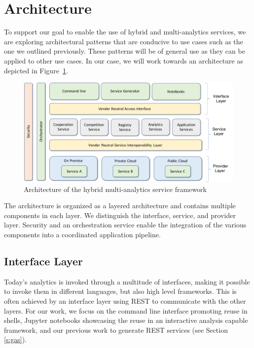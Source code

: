 
\section{Architecture}



To support our goal to enable the use of hybrid and multi-analytics
services, we are exploring architectural patterns
that are conducive to use cases such as the one we outlined
previously. These patterns will be of general use as they can
be applied to other use cases. In our case, we will work towards an
architecture as depicted in Figure~\ref{fig:arch}.

\begin{figure}[htb]
  \begin{center}
    \includegraphics[width=1.0\columnwidth]{images/hybrid-service-arch.pdf}
    \end{center}
  \caption {Architecture of the hybrid multi-analytics service
    framework}
  \label{fig:arch}
\end{figure}

The architecture is organized as a layered architecture and contains
multiple components in each layer. We distinguish the interface,
service, and provider layer. Security and an orchestration service
enable the integration of the various components into a coordinated
application pipeline.

\subsection{Interface Layer}

Today's analytics is invoked through a multitude of interfaces, making
it possible to invoke them in different languages, but also high level
frameworks. This is often achieved by an interface layer using REST
to communicate with the other layers. For our work, we focus on
the command line interface promoting reuse in shells, Jupyter notebooks
showcasing the reuse in an interactive analysis capable framework, and
our previous work to generate REST services (see Section \ref{s:gas}).

